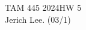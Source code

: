 \documentclass[12pt]{article}
\begin{document}
\noindent TAM 445 2024\hfill HW 5\\
Jerich Lee. (03/1)

\hrulefill



\end{document}
